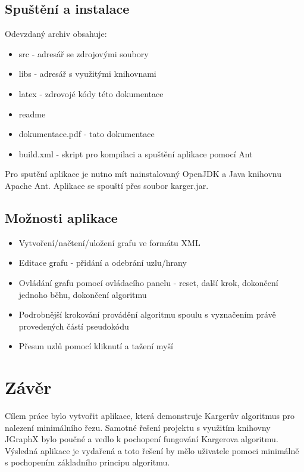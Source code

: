 \documentclass[../projekt.tex]{subfiles}
\begin{document}
\subsection{Spuštění a instalace}

Odevzdaný archiv obsahuje:

\begin{itemize}
	\item src - adresář se zdrojovými soubory
	\item libs - adresář s využitými knihovnami
	\item latex - zdrovojé kódy této dokumentace 
	\item readme
	\item dokumentace.pdf - tato dokumentace 
	\item build.xml - skript pro kompilaci a spuštění aplikace pomocí Ant
\end{itemize}

\noindent Pro sputění aplikace je nutno mít nainstalovaný OpenJDK a Java knihovnu Apache Ant. Aplikace se spouští přes soubor karger.jar.


\subsection{Možnosti aplikace}

\begin{itemize}
	\item Vytvoření/načtení/uložení grafu ve formátu XML
	\item Editace grafu - přidání a odebrání uzlu/hrany
	\item Ovládání grafu pomocí ovládacího panelu - reset, další krok, dokončení jednoho běhu, dokončení algoritmu
	\item Podrobnější krokování provádění algoritmu spoulu s vyznačením právě provedených částí pseudokódu
	\item Přesun uzlů pomocí kliknutí a tažení myší
\end{itemize}



\section{Závěr}

Cílem práce bylo vytvořit aplikace, která demonstruje Kargerův algoritmus pro nalezení minimálního řezu. Samotné řešení projektu s využitím knihovny JGraphX bylo poučné a vedlo k pochopení fungování Kargerova algoritmu. Výsledná aplikace je vydařená a toto řešení by mělo uživatele pomoci minimálně s pochopením základního principu algoritmu.
\end{document}
